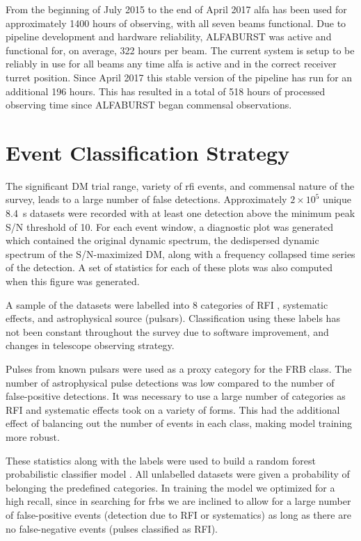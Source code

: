 \documentclass[a4paper,fleqn,usenatbib]{mnras}
\begin{document}
From the beginning of July 2015 to the end of April 2017 \gls{alfa} has been
used for approximately 1400 hours of observing, with all seven beams functional.
Due to pipeline development and hardware reliability, ALFABURST was active and
functional for, on average, 322 hours per beam.  The current system is setup to
be reliably in use for all beams any time \gls{alfa} is active and in the
correct receiver turret position. Since April 2017 this stable version of the
pipeline has run for an additional 196 hours. This has resulted in a total of
518 hours of processed observing time since ALFABURST began commensal observations.



\section{Event Classification Strategy}
\label{sec:event_classify}

The significant DM trial range, variety of \gls{rfi} events, and commensal
nature of the survey, leads to a large number of false detections. Approximately
$2 \times 10^5$ unique 8.4~s datasets were recorded with at least one detection
above the minimum peak S/N threshold of 10. For each event
window, a diagnostic plot was generated which contained the original dynamic
spectrum, the dedispersed dynamic spectrum of the S/N-maximized DM, along with a
frequency collapsed time series of the detection. A set of statistics for each
of these plots was also computed when this figure was generated.

A sample of the datasets were labelled into 8 categories of RFI , systematic
effects, and astrophysical source (pulsars). Classification using these labels
has not been constant throughout the survey due to software improvement, and
changes in telescope observing strategy.

Pulses from known pulsars were used as a proxy category for the FRB class. The
number of astrophysical pulse detections was low compared to the number of
false-positive detections. It was necessary to use a large number of categories
as RFI and systematic effects took on a variety of forms.  This had the
additional effect of balancing out the number of events in each class, making
model training more robust.

These statistics along with the labels were used to build a random forest
probabilistic classifier model \citep{Ho:1995:RDF:844379.844681,Breiman2001}.
All unlabelled datasets were given a probability of belonging the predefined
categories. In training the model we optimized for a high recall, since in
searching for \glspl{frb} we are inclined to allow for a large number of
false-positive events (detection due to RFI or systematics) as long as there are
no false-negative events (pulses classified as RFI).
\end{document}
